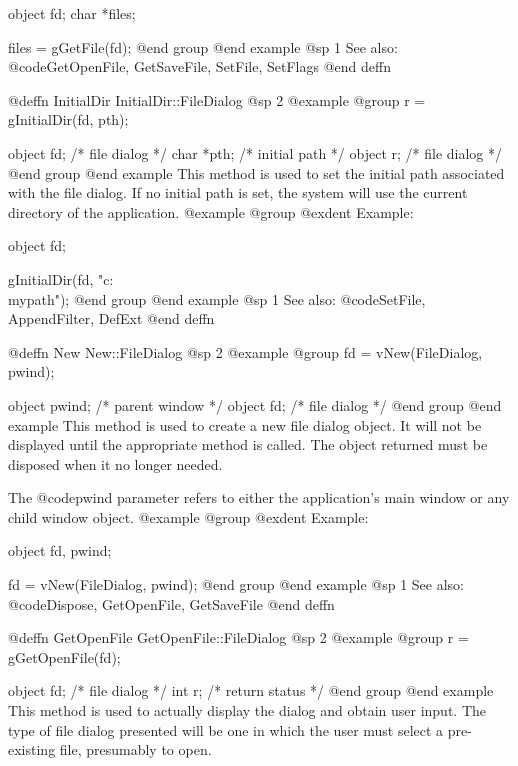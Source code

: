 object  fd;
char    *files;

files = gGetFile(fd);
@end group
@end example
@sp 1
See also:  @code{GetOpenFile, GetSaveFile, SetFile, SetFlags}
@end deffn















@deffn {InitialDir} InitialDir::FileDialog
@sp 2
@example
@group
r = gInitialDir(fd, pth);

object  fd;     /*  file dialog  */
char    *pth;   /*  initial path */
object  r;      /*  file dialog  */
@end group
@end example
This method is used to set the initial path associated with the file dialog.
If no initial path is set, the system will use the current directory of
the application.
@example
@group
@exdent Example:

object  fd;

gInitialDir(fd, "c:\\mypath");
@end group
@end example
@sp 1
See also:  @code{SetFile, AppendFilter, DefExt}
@end deffn







@deffn {New} New::FileDialog
@sp 2
@example
@group
fd = vNew(FileDialog, pwind);

object  pwind;  /*  parent window  */
object  fd;     /*  file dialog    */
@end group
@end example
This method is used to create a new file dialog object.  It will not be
displayed until the appropriate method is called.  The object returned
must be disposed when it no longer needed.

The @code{pwind} parameter refers to either the application's main window
or any child window object.
@example
@group
@exdent Example:

object  fd, pwind;

fd = vNew(FileDialog, pwind);
@end group
@end example
@sp 1
See also:  @code{Dispose, GetOpenFile, GetSaveFile}
@end deffn





@deffn {GetOpenFile} GetOpenFile::FileDialog
@sp 2
@example
@group
r = gGetOpenFile(fd);

object  fd;     /*  file dialog    */
int     r;      /*  return status  */
@end group
@end example
This method is used to actually display the dialog and obtain user input.
The type of file dialog presented will be one in which the user must
select a pre-existing file, presumably to open.

